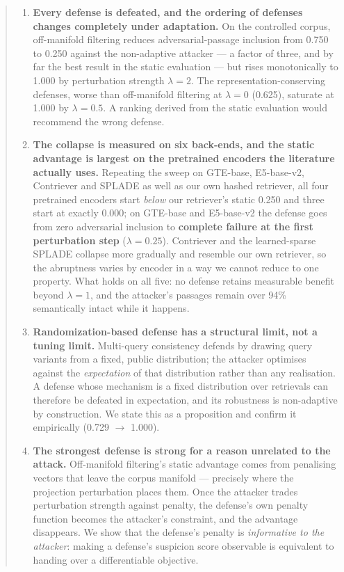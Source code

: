\documentclass[review,3p,times]{elsarticle}
\begin{document}
\begin{abstract}
\begin{enumerate}
\def\labelenumi{\arabic{enumi}.}
\item
  \textbf{Every defense is defeated, and the ordering of defenses changes completely under adaptation.} On the controlled corpus, off-manifold filtering reduces adversarial-passage inclusion from 0.750 to 0.250 against the non-adaptive attacker --- a factor of three, and by far the best result in the static evaluation --- but rises monotonically to 1.000 by perturbation strength \(\lambda = 2\). The representation-conserving defenses, worse than off-manifold filtering at \(\lambda = 0\) (0.625), saturate at 1.000 by \(\lambda = 0.5\). A ranking derived from the static evaluation would recommend the wrong defense.
\item
  \textbf{The collapse is measured on six back-ends, and the static advantage is largest on the pretrained encoders the literature actually uses.} Repeating the sweep on GTE-base, E5-base-v2, Contriever and SPLADE as well as our own hashed retriever, all four pretrained encoders start \emph{below} our retriever's static 0.250 and three start at exactly 0.000; on GTE-base and E5-base-v2 the defense goes from zero adversarial inclusion to \textbf{complete failure at the first perturbation step} (\(\lambda = 0.25\)). Contriever and the learned-sparse SPLADE collapse more gradually and resemble our own retriever, so the abruptness varies by encoder in a way we cannot reduce to one property. What holds on all five: no defense retains measurable benefit beyond \(\lambda = 1\), and the attacker's passages remain over 94\% semantically intact while it happens.
\item
  \textbf{Randomization-based defense has a structural limit, not a tuning limit.} Multi-query consistency defends by drawing query variants from a fixed, public distribution; the attacker optimises against the \emph{expectation} of that distribution rather than any realisation. A defense whose mechanism is a fixed distribution over retrievals can therefore be defeated in expectation, and its robustness is non-adaptive by construction. We state this as a proposition and confirm it empirically (0.729 \(\rightarrow\) 1.000).
\item
  \textbf{The strongest defense is strong for a reason unrelated to the attack.} Off-manifold filtering's static advantage comes from penalising vectors that leave the corpus manifold --- precisely where the projection perturbation places them. Once the attacker trades perturbation strength against penalty, the defense's own penalty function becomes the attacker's constraint, and the advantage disappears. We show that the defense's penalty is \emph{informative to the attacker}: making a defense's suspicion score observable is equivalent to handing over a differentiable objective.

\end{enumerate}
\end{abstract}
\end{document}

